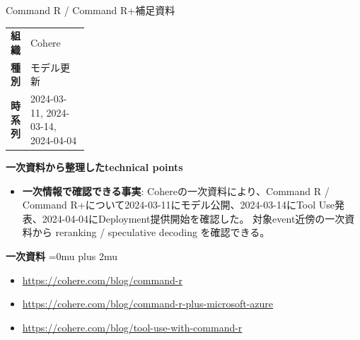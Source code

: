 \Needspace{0.38\textheight}
\begin{technicalnote}{Command R / Command R+}{補足資料}
\begingroup
\begin{tabularx}{\linewidth}{@{}>{\bfseries}p{0.22\linewidth}X@{}}
組織 & Cohere \\
種別 & モデル更新 \\
時系列 & 2024-03-11, 2024-03-14, 2024-04-04 \\
\end{tabularx}
\smallskip
{\bfseries 一次資料から整理したtechnical points}
\begin{itemize}[leftmargin=1.5em,itemsep=0.35em]
\item \textbf{一次情報で確認できる事実}: Cohereの一次資料により、Command R / Command R+について2024-03-11にモデル公開、2024-03-14にTool Use発表、2024-04-04にDeployment提供開始を確認した。 対象event近傍の一次資料から reranking / speculative decoding を確認できる。
\end{itemize}
\begin{minipage}{\linewidth}
\begin{samepage}
{\bfseries 一次資料}
\begingroup\sloppy
\Urlmuskip=0mu plus 2mu\relax
\begin{itemize}[leftmargin=1.5em,itemsep=0.25em]
\item {\scriptsize\url{https://cohere.com/blog/command-r}}
\item {\scriptsize\url{https://cohere.com/blog/command-r-plus-microsoft-azure}}
\item {\scriptsize\url{https://cohere.com/blog/tool-use-with-command-r}}
\end{itemize}
\endgroup
\end{samepage}
\end{minipage}
\endgroup
\end{technicalnote}
\medskip

